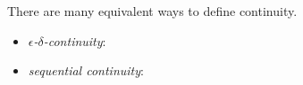\begin{defbox}
    \begin{definition}
        
    \end{definition}
\end{defbox}
\begin{defbox}
    \begin{definition}
        
    \end{definition}
\end{defbox}
\begin{thmbox}
    \begin{theorem}
        
    \end{theorem}
\end{thmbox}


\begin{rembox}
    \begin{definition}
        There are many equivalent ways to define continuity.
        \begin{itemize}
            \item \textit{\(\epsilon\)-\(\delta\)-continuity}:
            \item \textit{sequential continuity}:
        \end{itemize}
    \end{definition}
\end{rembox}